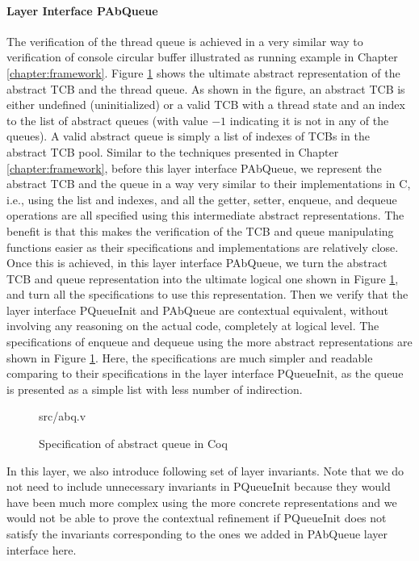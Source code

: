 \paragraph{Layer Interface PAbQueue}

The verification of the thread queue is achieved in a very similar way to
verification of console circular buffer illustrated as running example in Chapter \ref{chapter:framework}.
Figure \ref{fig:abq_v} shows the ultimate abstract representation of the abstract TCB and the thread queue.
As shown in the figure, an abstract TCB is either undefined (uninitialized) or a valid TCB with a thread state
and an index to the list of abstract queues (with value $-1$ indicating it is not in any of the queues).
A valid abstract queue is simply a list of indexes of TCBs in the abstract TCB pool.
Similar to the techniques presented in Chapter \ref{chapter:framework}, before this layer interface
PAbQueue, we represent the abstract TCB and the queue in a way very similar to their implementations in C, i.e.,
using the list and indexes, and all the getter, setter, enqueue, and dequeue operations are all specified using
this intermediate abstract representations. The benefit is that this makes the verification of the TCB and queue
manipulating functions easier as their specifications and implementations are relatively close.
Once this is achieved, in this layer interface PAbQueue, we turn the abstract TCB and queue representation
into the ultimate logical one shown in Figure \ref{fig:abq_v}, and turn all the specifications to use this representation.
Then we verify that the layer interface PQueueInit and PAbQueue are contextual equivalent, without involving any
reasoning on the actual code, completely at logical level.
The specifications of \textsf{enqueue} and \textsf{dequeue} using the more abstract representations are
shown in Figure \ref{fig:abq_v}. Here, the specifications are much simpler and readable comparing to their
specifications in the layer interface PQueueInit, as the queue is presented as a simple list with less number of
indirection.

\begin{figure}
	 {src/abq.v}
	\caption{Specification of abstract queue in Coq}
	\label{fig:abq_v}
\end{figure}

In this layer, we also introduce following set of layer invariants. Note that we do not need to include unnecessary
invariants in PQueueInit because they would have been much more complex using the more concrete
representations and we would not be able to prove the contextual refinement if PQueueInit does not satisfy
the invariants corresponding to the ones we added in PAbQueue layer interface here.

